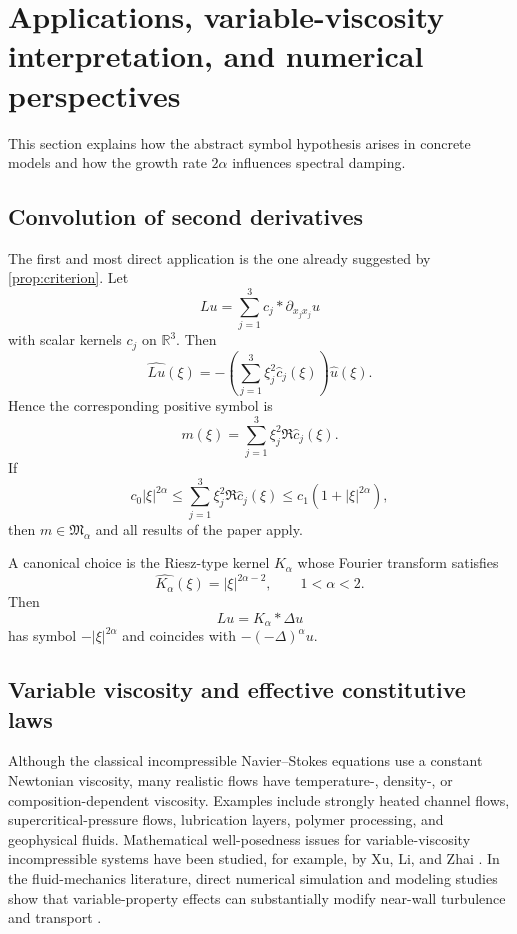 \documentclass[11pt]{article}
\theoremstyle{definition}
\theoremstyle{remark}
\newcommand{\R}{\mathbb{R}}
\begin{document}
\section{Applications, variable-viscosity interpretation, and numerical perspectives}\label{sec:applications}

This section explains how the abstract symbol hypothesis arises in concrete models and how the growth rate $2\alpha$ influences spectral damping.

\subsection{Convolution of second derivatives}

The first and most direct application is the one already suggested by \cref{prop:criterion}. Let
\begin{equation}\label{eq:kernel-model}
L u = \sum_{j=1}^3 c_j * \partial_{x_jx_j}u
\end{equation}
with scalar kernels $c_j$ on $\R^3$. Then
\[
\widehat{Lu}(\xi)
=
-
\left(
\sum_{j=1}^3 \xi_j^2 \hat c_j(\xi)
\right)\hat u(\xi).
\]
Hence the corresponding positive symbol is
\[
m(\xi)=\sum_{j=1}^3 \xi_j^2 \Re \hat c_j(\xi).
\]
If
\[
c_0 |\xi|^{2\alpha}
\le
\sum_{j=1}^3 \xi_j^2 \Re \hat c_j(\xi)
\le
c_1 (1+|\xi|^{2\alpha}),
\]
then $m\in\mathfrak M_\alpha$ and all results of the paper apply.

A canonical choice is the Riesz-type kernel $K_\alpha$ whose Fourier transform satisfies
\[
\widehat{K_\alpha}(\xi)=|\xi|^{2\alpha-2},
\qquad 1<\alpha<2.
\]
Then
\[
L u
=
K_\alpha * \Delta u
\]
has symbol $-|\xi|^{2\alpha}$ and coincides with $-(-\Delta)^\alpha u$.

\subsection{Variable viscosity and effective constitutive laws}

Although the classical incompressible Navier--Stokes equations use a constant Newtonian viscosity, many realistic flows have temperature-, density-, or composition-dependent viscosity. Examples include strongly heated channel flows, supercritical-pressure flows, lubrication layers, polymer processing, and geophysical fluids. Mathematical well-posedness issues for variable-viscosity incompressible systems have been studied, for example, by Xu, Li, and Zhai \cite{XuLiZhai2016}. In the fluid-mechanics literature, direct numerical simulation and modeling studies show that variable-property effects can substantially modify near-wall turbulence and transport \cite{ZontaMarchioliSoldati2012,PecnikPatel2017}.
\end{document}
